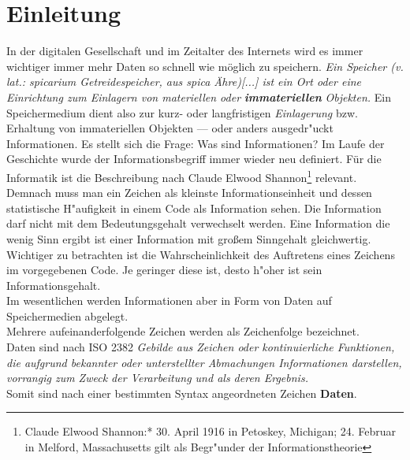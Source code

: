 
\chapter{Einleitung}
\label{ch:Einleitung}

In der digitalen Gesellschaft und im Zeitalter des Internets wird es immer wichtiger immer mehr Daten so schnell wie möglich zu speichern.  \textit{Ein Speicher (v. lat.: spicarium Getreidespeicher, aus spica Ähre)[...] ist ein Ort oder eine Einrichtung zum Einlagern von materiellen oder} \textbf{\textit{immateriellen}} \textit{Objekten.}\cite{wiki:Speicher}
\newline
Ein Speichermedium dient also zur kurz- oder langfristigen \glqq \textit{Einlagerung}\grqq{} bzw. \mbox{Erhaltung} von immateriellen Objekten --- oder anders ausgedr"uckt Informationen. 
Es stellt sich die Frage: Was sind Informationen? \newline
Im Laufe der Geschichte wurde der Informationsbegriff immer wieder neu definiert. Für die Informatik ist die Beschreibung nach Claude Elwood Shannon\footnote{Claude Elwood Shannon:* 30. April 1916 in Petoskey, Michigan; \textdagger{} 24. Februar in Melford, Massachusetts gilt als Begr"under der Informationstheorie} relevant. Demnach muss man ein Zeichen als kleinste Informationseinheit und dessen \mbox{statistische} H"aufigkeit in einem Code als Information sehen. 
\newline
Die Information darf nicht mit dem Bedeutungsgehalt verwechselt werden. Eine Information die wenig Sinn ergibt ist einer Information mit großem Sinngehalt gleichwertig. Wichtiger zu betrachten ist die Wahrscheinlichkeit des Auftretens eines Zeichens im vorgegebenen Code. Je geringer diese ist, desto h"oher ist sein \mbox{Informationsgehalt}.
\\
Im wesentlichen werden Informationen aber in Form von Daten auf Speichermedien abgelegt. 
\\Mehrere aufeinanderfolgende Zeichen werden als Zeichenfolge bezeichnet.\cite{hansen:wi1}
\\ 
Daten sind nach ISO 2382 
\glqq \textit{Gebilde aus Zeichen oder kontinuierliche Funktionen, die aufgrund bekannter oder unterstellter Abmachungen Informationen darstellen, vorrangig zum Zweck der Verarbeitung und als deren Ergebnis.}\grqq{}
\\
Somit sind nach einer bestimmten Syntax angeordneten Zeichen \textbf{Daten}.

